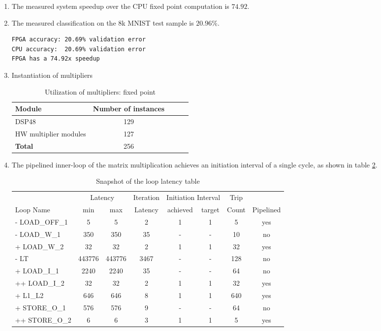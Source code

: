 \documentclass[../main.tex]{subfiles}
\begin{document}
\begin{enumerate}[label=(\arabic*)]
\item The measured system speedup over the CPU fixed point computation is $74.92$.
\item The measured classification on the 8k MNIST test sample is $20.96\%$.
	\begin{lstlisting}
FPGA accuracy: 20.69% validation error
CPU accuracy:  20.69% validation error
FPGA has a 74.92x speedup
	\end{lstlisting}


\item Instantiation of multipliers
	\begin{table}[H]
	\centering
	\begin{tabular}{lcccc}
		Module & Number of instances \\
		\hline
		DSP48 & 129 \\
		HW multiplier modules & 127 \\
		\hline 
		\textbf{Total} & 256
	\end{tabular}
	\caption{Utilization of multipliers: fixed point}
	\label{2-resources-arithmetic}
\end{table}


\item The pipelined inner-loop of the matrix multiplication achieves an initiation interval of a single cycle, as shown in table \ref{2-loop-latencies}.
	\begin{table}[H]
	\centering
	\begin{tabular}{l|ccccccc}
				  &    \multicolumn{2}{c}{Latency}     & Iteration&  \multicolumn{2}{c}{Initiation Interval}  & Trip &           \\
				Loop Name	 &   min  &   max  &  Latency &  achieved &   target  & Count& Pipelined \\
			  \hline
          - LOAD\_OFF\_1    &       5&       5&         2&          1&          1&     5&    yes    \\
          - LOAD\_W\_1      &     350&     350&        35&          -&          -&    10&    no     \\
           + LOAD\_W\_2     &      32&      32&         2&          1&          1&    32&    yes    \\
		   \hline
          - LT            &  443776&  443776&      3467&          -&          -&   128&    no     \\
           + LOAD\_I\_1     &    2240&    2240&        35&          -&          -&    64&    no     \\
            ++ LOAD\_I\_2   &      32&      32&         2&          1&          1&    32&    yes    \\
           + L1\_L2        &     646&     646&         8&          1&          1&   640&    yes    \\
		   \hline
           + STORE\_O\_1    &     576&     576&         9&          -&          -&    64&    no     \\
            ++ STORE\_O\_2  &       6&       6&         3&          1&          1&     5&    yes    
	\end{tabular}
	\caption{Snapshot of the loop latency table}
	\label{2-loop-latencies}
\end{table}


\end{enumerate}
\end{document}
